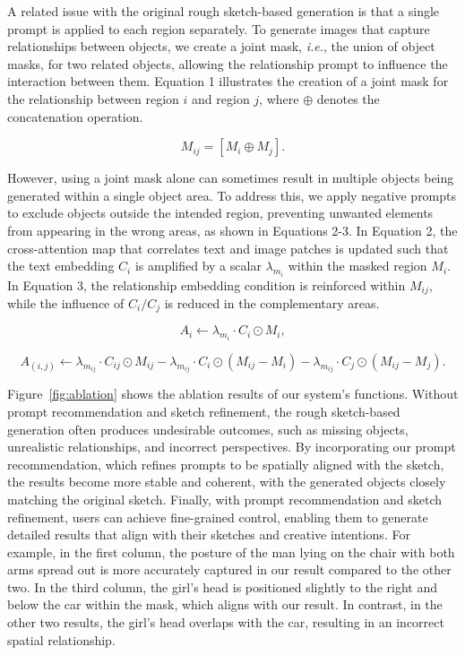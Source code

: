 A related issue with the original rough sketch-based generation is that a single prompt is applied to each region separately. 
To generate images that capture relationships between objects, we create a joint mask, \textit{i.e.}, the union of object masks, for two related objects, allowing the relationship prompt to influence the interaction between them. 
Equation 1 illustrates the creation of a joint mask for the relationship between region $i$ and region $j$, 
where $\oplus$ denotes the concatenation operation.

\begin{equation}
M_{ij} = [M_i \oplus M_j].
\end{equation}

However, using a joint mask alone can sometimes result in multiple objects being generated within a single object area. 
To address this, we apply negative prompts to exclude objects outside the intended region, preventing unwanted elements from appearing in the wrong areas, as shown in Equations 2-3.
In Equation 2, the cross-attention map that correlates text and image patches is updated such that the text embedding $C_i$ is amplified by a scalar $\lambda_{m_i}$ within the masked region $M_i$.
In Equation 3, the relationship embedding condition is reinforced within $M_{ij}$, while the influence of $C_i / C_j$ is reduced in the complementary areas.

\begin{equation}
A_i \leftarrow \lambda_{m_i} \cdot C_i \odot M_i,
\end{equation}

\begin{equation}
A_{(i,j)} \leftarrow \lambda_{m_{ij}} \cdot C_{ij} \odot M_{ij} - \lambda_{m_{ij}} \cdot C_i \odot (M_{ij}-M_i) - \lambda_{m_{ij}} \cdot C_j \odot (M_{ij} - M_j).
\end{equation}



Figure~\ref{fig:ablation} shows the ablation results of our system’s functions.
Without prompt recommendation and sketch refinement, the rough sketch-based generation often produces undesirable outcomes, such as missing objects, unrealistic relationships, and incorrect perspectives.
By incorporating our prompt recommendation, which refines prompts to be spatially aligned with the sketch, the results become more stable and coherent, with the generated objects closely matching the original sketch.
Finally, with prompt recommendation and sketch refinement, users can achieve fine-grained control, enabling them to generate detailed results that align with their sketches and creative intentions. For example, in the first column, the posture of the man lying on the chair with both arms spread out is more accurately captured in our result compared to the other two. 
In the third column, the girl's head is positioned slightly to the right and below the car within the mask, which aligns with our result. In contrast, in the other two results, the girl's head overlaps with the car, resulting in an incorrect spatial relationship.









